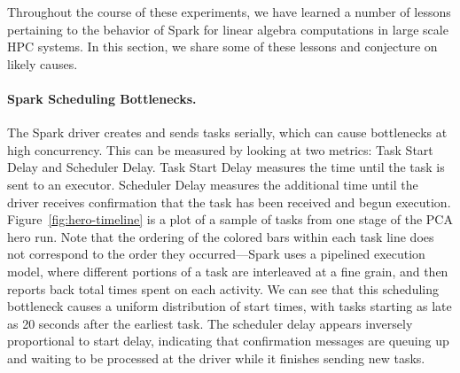 Throughout the course of these experiments, we have learned a number of lessons pertaining to the behavior of Spark for linear algebra computations in large scale HPC systems. 
In this section, we share some of these lessons and conjecture on likely causes.
\paragraph{Spark Scheduling Bottlenecks.}
The Spark driver creates and sends tasks serially, which can cause bottlenecks at high concurrency.  This can be measured by looking at two metrics: Task Start Delay and Scheduler Delay. Task Start Delay measures the time until the  task is sent to an executor. Scheduler Delay measures the additional time until the driver receives confirmation that the task has been received and begun execution. Figure~\ref{fig:hero-timeline} is a plot of a sample of tasks from one stage of the PCA hero run.  Note that the ordering of the colored bars within each task line does not correspond to the order they occurred---Spark uses a pipelined execution model, where different portions of a task are interleaved at a fine grain, and then reports back total times spent on each activity.  We can see that this scheduling bottleneck causes a uniform distribution of start times, with tasks starting as late as 20 seconds after the earliest task.  The scheduler delay appears inversely proportional to start delay, indicating that confirmation messages are queuing up and waiting to be processed at the driver while it finishes sending new tasks.

